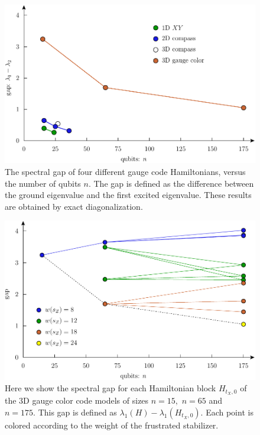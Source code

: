 \begin{figure}
\begin{center}
\includegraphics[width=1.0\columnwidth]{pic-gap.pdf}
\caption{The spectral gap of four different gauge code Hamiltonians, versus the number
of qubits $n$. The gap is defined as the difference between
the ground eigenvalue and the first excited eigenvalue.
These results are obtained by exact diagonalization.
}
\label{PicGap}
\end{center}
\end{figure}

\begin{figure}
\begin{center}
\includegraphics[width=1.0\columnwidth]{pic-gap-stabs.pdf}
\caption{
Here we show the spectral gap
for each Hamiltonian block $H_{t_X,0}$
of the 3D gauge color code models of sizes $n=15,$ $n=65$ and $n=175.$
This gap is defined as $\lambda_1(H) - \lambda_1(H_{t_X,0}).$
Each point is colored according to the weight of the
frustrated stabilizer.
}
\label{PicGapStabs}
\end{center}
\end{figure}

